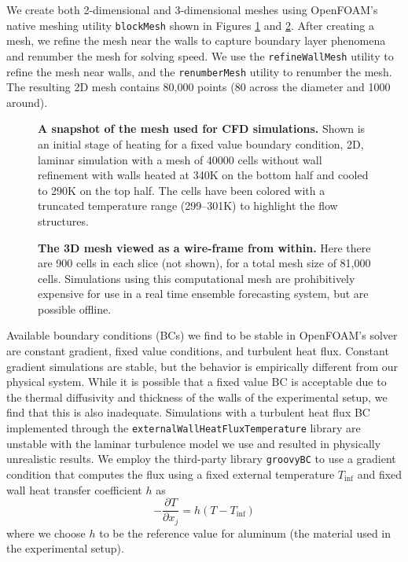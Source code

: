 \documentclass[10pt,letterpaper]{article}
\newcommand{\partialdiff}[2]{\frac{\partial #1}{\partial #2}}
\begin{document}
We create both 2-dimensional and 3-dimensional meshes using OpenFOAM's native meshing utility \verb|blockMesh| shown in Figures \ref{fig:CFDmesh1} and \ref{fig:CFDmesh2}.
After creating a mesh, we refine the mesh near the walls to capture boundary layer phenomena and renumber the mesh for solving speed.
We use the \verb|refineWallMesh| utility to refine the mesh near walls, and the \verb|renumberMesh| utility to renumber the mesh.
The resulting 2D mesh contains 80,000 points (80 across the diameter and 1000 around).

\begin{figure}[h]
  \centering
  \caption[A snapshot of the mesh used for CFD simulations]{
\textbf{    A snapshot of the mesh used for CFD simulations.
}    Shown is an initial stage of heating for a fixed value boundary condition, 2D, laminar simulation with a mesh of 40000 cells without wall refinement with walls heated at 340K on the bottom half and cooled to 290K on the top half.
    The cells have been colored with a truncated temperature range (299--301K) to highlight the flow structures.
  }
  \label{fig:CFDmesh1}
\end{figure}

\begin{figure}[h]
  \centering
  \caption[The 3D mesh viewed as a wire-frame from within]{
\textbf{    The 3D mesh viewed as a wire-frame from within.
}    Here there are 900 cells in each slice (not shown), for a total mesh size of 81,000 cells.
    Simulations using this computational mesh are prohibitively expensive for use in a real time ensemble forecasting system, but are possible offline.
  }
  \label{fig:CFDmesh2}
\end{figure}

Available boundary conditions (BCs) we find to be stable in OpenFOAM's solver are constant gradient, fixed value conditions, and turbulent heat flux.
Constant gradient simulations are stable, but the behavior is empirically different from our physical system.
While it is possible that a fixed value BC is acceptable due to the thermal diffusivity and thickness of the walls of the experimental setup, we find that this is also inadequate.
Simulations with a turbulent heat flux BC implemented through the \verb|externalWallHeatFluxTemperature| library are unstable with the laminar turbulence model we use and resulted in physically unrealistic results.
We employ the third-party library \verb|groovyBC| to use a gradient condition that computes the flux using a fixed external temperature $T_\text{inf}$ and fixed wall heat transfer coefficient $h$ as $$ - \partialdiff{T}{x_j} = h \left( T-T_\text{inf} \right)$$ where we choose $h$ to be the reference value for aluminum (the material used in the experimental setup).
\end{document}
